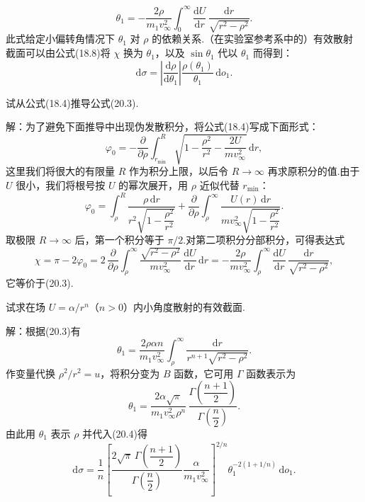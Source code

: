 \begin{equation}
  \theta_1=-\frac{2\rho}{m_1v_\infty^2}\int_0^{\infty}
  \frac{\mathrm{d}U}{\mathrm{d}r}\,\frac{\mathrm{d}r}{\sqrt{r^2-\rho^2}}.
\end{equation}
此式给定小偏转角情况下 $\theta_1$ 对 $\rho$ 的依赖关系.（在实验室参考系中的）有效散射截面可以由公式(18.8)将 $\chi$ 换为 $\theta_1$，以及 $\sin\theta_1$ 代以 $\theta_1$ 而得到：
\begin{equation}
  \mathrm{d}\sigma=\left|\frac{\mathrm{d}\rho}{\mathrm{d}\theta_1}\right|
  \frac{\rho(\theta_1)}{\theta_1}\,\mathrm{d}o_1.
\end{equation}

\begin{xiti}

\quad 试从公式(18.4)推导公式(20.3).

解：为了避免下面推导中出现伪发散积分，将公式(18.4)写成下面形式：
\begin{equation*}
  \varphi_0=-\frac{\partial}{\partial\rho}\int_{r_\mathrm{min}}^{R}
  \sqrt{1-\frac{\rho^2}{r^2}-\frac{2U}{mv_\infty^2}}\,\mathrm{d}r,
\end{equation*}
这里我们将很大的有限量 $R$ 作为积分上限，以后令 $R\to\infty$ 再求原积分的值.由于 $U$ 很小，我们将根号按 $U$ 的幂次展开，用 $\rho$ 近似代替 $r_\mathrm{min}$：
\begin{equation*}
  \varphi_0=\int_{\rho}^{R}\frac{\rho\,\mathrm{d}r}
  {r^2\sqrt{1-\dfrac{\rho^2}{r^2}}}
  +\frac{\partial}{\partial\rho}\int_{\rho}^{\infty}
  \frac{U(r)\,\mathrm{d}r}{mv_\infty^2\sqrt{1-\dfrac{\rho^2}{r^2}}}.
\end{equation*}
取极限 $R\to\infty$ 后，第一个积分等于 $\pi/2$.对第二项积分分部积分，可得表达式
\begin{equation*}
  \chi=\pi-2\varphi_0
  =2\,\frac{\partial}{\partial\rho}\int_{\rho}^{\infty}
  \frac{\sqrt{r^2-\rho^2}}{mv_\infty^2}\,
  \frac{\mathrm{d}U}{\mathrm{d}r}\,\mathrm{d}r
  =-\frac{2\rho}{mv_\infty^2}\int_{\rho}^{\infty}
  \frac{\mathrm{d}U}{\mathrm{d}r}\,
  \frac{\mathrm{d}r}{\sqrt{r^2-\rho^2}},
\end{equation*}
它等价于(20.3).

\quad 试求在场 $U=\alpha/r^n$（$n>0$）内小角度散射的有效截面.

解：根据(20.3)有
\begin{equation*}
  \theta_1=\frac{2\rho\alpha n}{m_1v_\infty^2}\int_{\rho}^{\infty}
  \frac{\mathrm{d}r}{r^{n+1}\sqrt{r^2-\rho^2}}.
\end{equation*}
作变量代换 $\rho^2/r^2=u$，将积分变为 $B$ 函数，它可用 $\Gamma$ 函数表示为
\begin{equation*}
  \theta_1=\frac{2\alpha\sqrt{\pi}}{m_1v_\infty^2\rho^n}\,
  \frac{\Gamma\left(\dfrac{n+1}{2}\right)}{\Gamma\left(\dfrac{n}{2}\right)}.
\end{equation*}
由此用 $\theta_1$ 表示 $\rho$ 并代入(20.4)得
\begin{equation*}
  \mathrm{d}\sigma=\frac{1}{n}\left[
  \frac{2\sqrt{\pi}\,\Gamma\left(\dfrac{n+1}{2}\right)}
  {\Gamma\left(\dfrac{n}{2}\right)}
  \frac{\alpha}{m_1v_\infty^2}\right]^{2/n}
  \theta_1^{-2(1+1/n)}\,\mathrm{d}o_1.
\end{equation*}

\end{xiti}
